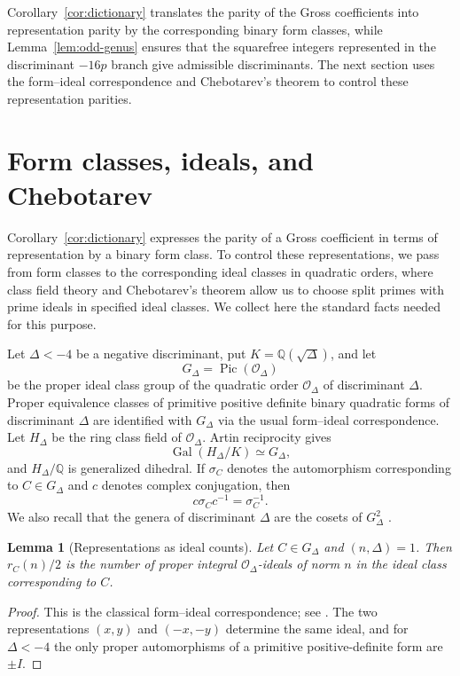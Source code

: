 \documentclass[11pt]{amsart}
\newtheorem{lemma}[theorem]{Lemma}
\theoremstyle{definition}
\theoremstyle{remark}
\newcommand{\Q}{\mathbb{Q}}
\newcommand{\OO}{\mathcal{O}}
\newcommand{\Pic}{\operatorname{Pic}}
\newcommand{\Gal}{\operatorname{Gal}}
\begin{document}
Corollary~\ref{cor:dictionary} translates the parity of the Gross
coefficients into representation parity by the corresponding binary form
classes, while Lemma~\ref{lem:odd-genus} ensures that the squarefree
integers represented in the discriminant $-16p$ branch give admissible
discriminants. The next section uses the form--ideal correspondence and
Chebotarev's theorem to control these representation parities.

\section{Form classes, ideals, and Chebotarev}\label{sec:classfield}

Corollary~\ref{cor:dictionary} expresses the parity of a Gross coefficient
in terms of representation by a binary form class. To control these
representations, we pass from form classes to the corresponding ideal classes
in quadratic orders, where class field theory and Chebotarev's theorem allow
us to choose split primes with prime ideals in specified ideal classes.
We collect here the standard facts needed for this purpose.

Let $\Delta<-4$ be a negative discriminant, put
$K=\Q(\sqrt{\Delta})$, and let
\[
  G_\Delta=\Pic(\OO_\Delta)
\]
be the proper ideal class group of the quadratic order $\OO_\Delta$ of
discriminant $\Delta$. Proper equivalence classes of primitive positive
definite binary quadratic forms of discriminant $\Delta$ are identified
with $G_\Delta$ via the usual form--ideal correspondence.
Let $H_\Delta$ be the ring class field of $\OO_\Delta$. Artin reciprocity
gives
\[
  \Gal(H_\Delta/K)\simeq G_\Delta,
\]
and $H_\Delta/\Q$ is generalized dihedral. If $\sigma_C$ denotes the
automorphism corresponding to $C\in G_\Delta$ and $c$ denotes complex
conjugation, then
\[
  c\sigma_Cc^{-1}=\sigma_C^{-1}.
\]
We also recall that the genera of discriminant $\Delta$ are the cosets of
$G_\Delta^2$ \cite[Theorem~3.15]{Cox2013}.

\begin{lemma}[Representations as ideal counts]
\label{lem:representations-ideals}
Let $C\in G_\Delta$ and $(n,\Delta)=1$. Then $r_C(n)/2$ is the number of
proper integral $\OO_\Delta$-ideals of norm $n$ in the ideal class
corresponding to $C$.
\end{lemma}

\begin{proof}
This is the classical form--ideal correspondence; see
\cite[Theorem~7.7 and Chapter~9]{Cox2013}. The two representations
$(x,y)$ and $(-x,-y)$ determine the same ideal, and for $\Delta<-4$ the
only proper automorphisms of a primitive positive-definite form are
$\pm I$.
\end{proof}
\end{document}
